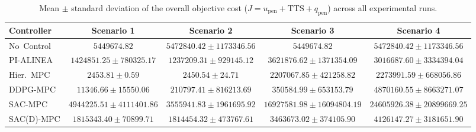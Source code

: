 \begin{table}[htbp]
\centering
\caption{Mean $\pm$ standard deviation of the overall objective cost ($J = u_{\mathrm{pen}} + \mathrm{TTS} + q_{\mathrm{pen}}$) across all experimental runs.}
\label{tab:obj_comparison}
\begin{tabular}{lcccc}
\toprule
Controller & Scenario 1 & Scenario 2 & Scenario 3 & Scenario 4 \\
\midrule
No~Control & $5449674.82$ & $5472840.42 \pm 1173346.56$ & $5449674.82$ & $5472840.42 \pm 1173346.56$ \\
PI-ALINEA & $1424851.25 \pm 780325.17$ & $1237209.31 \pm 929145.12$ & $3621876.62 \pm 1371354.09$ & $3016687.60 \pm 3334394.04$ \\
Hier.~MPC & $2453.81 \pm 0.59$ & $2450.54 \pm 24.71$ & $2207067.85 \pm 421258.82$ & $2273991.59 \pm 668056.86$ \\
DDPG-MPC & $11346.66 \pm 15550.06$ & $210797.41 \pm 816213.69$ & $350584.99 \pm 653153.79$ & $4870160.55 \pm 8663271.07$ \\
SAC-MPC & $4944225.51 \pm 4111401.86$ & $3555941.83 \pm 1961695.92$ & $16927581.98 \pm 16094804.19$ & $24605926.38 \pm 20899669.25$ \\
SAC(D)-MPC & $1815343.40 \pm 70899.71$ & $1814454.32 \pm 473767.61$ & $3463673.02 \pm 374105.90$ & $4126147.27 \pm 3181651.90$ \\
\bottomrule
\end{tabular}
\end{table}

